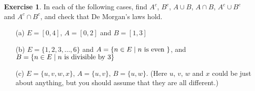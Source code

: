 \documentclass[a4paper]{book}
\theoremstyle{definition}
\newtheorem{exercise}[theorem]{Exercise}
\begin{document}
\begin{exercise}
 In each of the following cases, find $A^c$, $B^c$, $A\cup B$,
 $A\cap B$, $A^c\cup B^c$ and $A^c\cap B^c$, and check that De
 Morgan's laws hold.
 \begin{itemize}
  \item[(a)] $E=[0,4]$, $A=[0,2]$ and $B=[1,3]$
  \item[(b)] $E=\{1,2,3,\dotsc,6\}$ and 
   $A=\{n\in E\;|\; n \text{ is even }\}$,
   and $B=\{n\in E\;|\; n \text{ is divisible by } 3\}$
  \item[(c)] $E=\{u,v,w,x\}$, $A=\{u,v\}$, $B=\{u,w\}$.  (Here $u$, $v$,
   $w$ and $x$ could be just about anything, but you should assume
   that they are all different.)
 \end{itemize}
\end{exercise}
\end{document}
